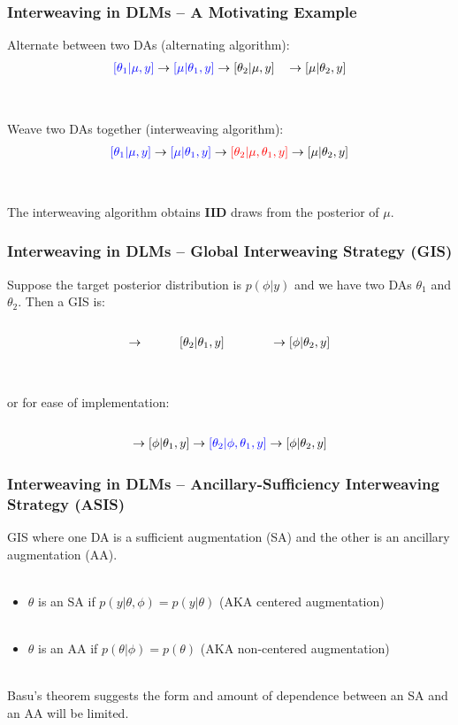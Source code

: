 \documentclass[xcolor=dvipsnames]{beamer}
\begin{document}
\begin{frame}
\frametitle{Interweaving in DLMs -- A Motivating Example}
Alternate between two DAs (alternating algorithm):
\begin{align*}
{\color{blue}[\theta_1|\mu,y]} \to {\color{blue}[\mu|\theta_1,y]} \to [\theta_2|\mu,y]\phantom{\theta_1} \to [\mu|\theta_2,y]
\end{align*}\\~\\
\pause Weave two DAs together (interweaving algorithm):
\begin{align*}
{\color{blue}[\theta_1|\mu,y]} \to {\color{blue}[\mu|\theta_1,y]} \to {\color{red}[\theta_2|\mu,\theta_1,y]} \to [\mu|\theta_2,y]
\end{align*}\\~\\\pause
The interweaving algorithm obtains {\bf IID} draws from the posterior of $\mu$.
\end{frame}

\begin{frame}
\frametitle{Interweaving in DLMs -- Global Interweaving Strategy (GIS)}
Suppose the target posterior distribution is $p(\phi|y)$ and we have two DAs $\theta_1$ and $\theta_2$. Then a GIS is: \\~
\begin{align*}
[\theta_1|\phi,y] \to \hspace{1cm} [\theta_2|\theta_1,y] \hspace{1.3cm} \to [\phi|\theta_2,y]
\end{align*}\\~\\
\pause or for ease of implementation:\\~
\begin{align*}
[\theta_1|\phi,y] \to [\phi|\theta_1,y] \to {\color{blue}[\theta_2|\phi,\theta_1,y]} \to [\phi|\theta_2,y]
\end{align*}
\end{frame}

\begin{frame}
\frametitle{Interweaving in DLMs -- Ancillary-Sufficiency Interweaving Strategy (ASIS)} 
GIS where one DA is a sufficient augmentation (SA) and the other is an ancillary augmentation (AA).\\~\\
\begin{itemize}
\item$\theta$ is an SA if $p(y|\theta,\phi)=p(y|\theta)$ (AKA centered augmentation)\\~\\
\item$\theta$ is an AA if $p(\theta|\phi)=p(\theta)$ (AKA non-centered augmentation)\\~\\
\end{itemize}
\pause Basu's theorem suggests the form and amount of dependence between an SA and an AA will be limited.
\end{frame}
\end{document}
